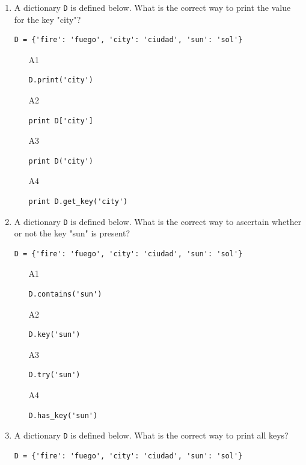 \begin{enumerate}
\begin{enumerate}
\end{enumerate}
\item A dictionary {\tt D} is defined below. What is the correct way to print the value for 
the key "city"?
\begin{verbatim}
D = {'fire': 'fuego', 'city': 'ciudad', 'sun': 'sol'}
\end{verbatim}
\begin{enumerate}
\item[A1] 
\begin{verbatim}
D.print('city')
\end{verbatim}
\item[A2] 
\begin{verbatim}
print D['city']
\end{verbatim}
\item[A3] 
\begin{verbatim}
print D('city')
\end{verbatim}
\item[A4] 
\begin{verbatim}
print D.get_key('city')
\end{verbatim}
\end{enumerate}
\item A dictionary {\tt D} is defined below. What is the correct way to ascertain whether
or not the key "sun" is present?
\begin{verbatim}
D = {'fire': 'fuego', 'city': 'ciudad', 'sun': 'sol'}
\end{verbatim}
\begin{enumerate}
\item[A1] 
\begin{verbatim}
D.contains('sun')
\end{verbatim}
\item[A2] 
\begin{verbatim}
D.key('sun')
\end{verbatim}
\item[A3] 
\begin{verbatim}
D.try('sun')
\end{verbatim}
\item[A4] 
\begin{verbatim}
D.has_key('sun')
\end{verbatim}
\end{enumerate}
\item A dictionary {\tt D} is defined below. What is the correct way to print 
all keys?
\begin{verbatim}
D = {'fire': 'fuego', 'city': 'ciudad', 'sun': 'sol'}

\end{verbatim}
\end{enumerate}

